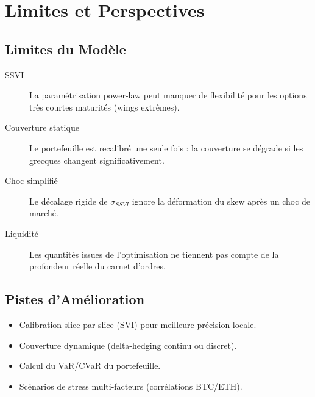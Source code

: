 \section{Limites et Perspectives}
\label{sec:limites}

\subsection{Limites du Modèle}

\begin{description}
  \item[SSVI] La paramétrisation power-law peut manquer de flexibilité
    pour les options très courtes maturités (wings extrêmes).
  \item[Couverture statique] Le portefeuille est recalibré une seule fois :
    la couverture se dégrade si les grecques changent significativement.
  \item[Choc simplifié] Le décalage rigide de $\sigma_{SSVI}$ ignore la
    déformation du skew après un choc de marché.
  \item[Liquidité] Les quantités issues de l'optimisation ne tiennent pas
    compte de la profondeur réelle du carnet d'ordres.
\end{description}

\subsection{Pistes d'Amélioration}

\begin{itemize}
  \item Calibration slice-par-slice (SVI) pour meilleure précision locale.
  \item Couverture dynamique (delta-hedging continu ou discret).
  \item Calcul du VaR/CVaR du portefeuille.
  \item Scénarios de stress multi-facteurs (corrélations BTC/ETH).
\end{itemize}
